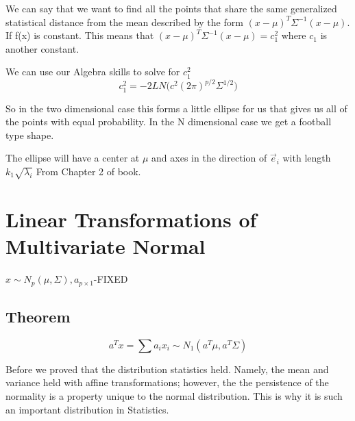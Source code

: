 We can say that we want to find all the points that share the same generalized statistical distance from the mean described by the form $(x-\mu)^T\Sigma^{-1}(x-\mu)$. If f(x) is constant. This means that $(x-\mu)^T\Sigma^{-1}(x-\mu)=c_1^2$ where $c_1$ is another constant.

We can use our Algebra skills to solve for $c_1^2$
\begin{equation*}
    c_1^2 = -2LN\big(c^2(2\pi)^{p/2}\Sigma^{1/2}\big)
\end{equation*}

So in the two dimensional case this forms a little ellipse for us that gives us all of the points with equal probability. In the N dimensional case we get a football type shape.

The ellipse will have a center at $\mu$ and axes in the direction of $\Vec{e}_i$ with length $k_1\sqrt{\lambda_i}$ From Chapter 2 of book.

\section{Linear Transformations of Multivariate Normal}
$x\sim N_p(\mu,\Sigma),a_{p \times 1}$-FIXED
\subsection{Theorem}
\begin{equation*}
    a^Tx=\sum a_ix_i \sim N_1(a^T\mu,a^T\Sigma)
\end{equation*}

Before we proved that the distribution statistics held. Namely, the mean and variance held with affine transformations; however, the the persistence of the normality is a property unique to the normal distribution. This is why it is such an important distribution in Statistics.